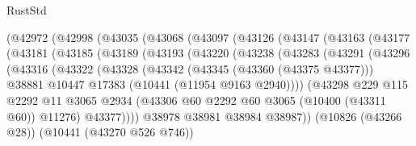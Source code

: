 \begin{lexlean}{RustStd}
\begin{coremodule}
              (@42972
                (@42998
                  (@43035
                    (@43068
                      (@43097
                        (@43126
                          (@43147
                            (@43163
                              (@43177
                                (@43181
                                  (@43185
                                    (@43189
                                      (@43193
                                        (@43220
                                          (@43238
                                            (@43283
                                              (@43291
                                                (@43296
                                                  (@43316
                                                    (@43322
                                                      (@43328
                                                        (@43342
                                                          (@43345 (@43360 (@43375 @43377)))
                                                          @38881
                                                          @10447
                                                          @17383
                                                          (@10441 (@11954 @9163 @2940))))
                                                      (@43298
                                                        @229
                                                        @115
                                                        @2292
                                                        @11
                                                        @3065
                                                        @2934
                                                        (@43306
                                                          @60
                                                          @2292
                                                          @60
                                                          @3065
                                                          (@10400 (@43311 @60))
                                                          @11276)
                                                        @43377))))
                                                @38978
                                                @38981
                                                @38984
                                                @38987))
                                            (@10826 (@43266 @28))
                                            (@10441 (@43270 @526 @746))

\end{coremodule}
\end{lexlean}
